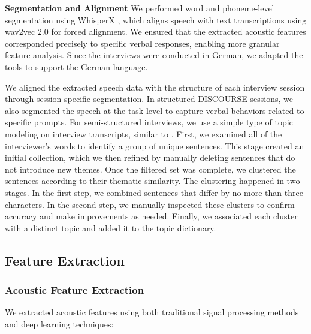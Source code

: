 \documentclass[9pt,a4paper]{rho-class/rho}
\begin{document}
\textbf{Segmentation and Alignment} We performed word and phoneme-level segmentation using WhisperX \cite{bain2023whisperx, Spiller2023}, which aligns speech with text transcriptions using wav2vec 2.0 \cite{baevski2020wav2vec} for forced alignment. We ensured that the extracted acoustic features corresponded precisely to specific verbal responses, enabling more granular feature analysis. Since the interviews were conducted in German, we adapted the tools to support the German language.

We aligned the extracted speech data with the structure of each interview session through session-specific segmentation. In structured DISCOURSE sessions, we also segmented the speech at the task level to capture verbal behaviors related to specific prompts. For semi-structured interviews, we use a simple type of topic modeling on interview transcripts, similar to \cite{gong2017topic}. First, we examined all of the interviewer's words to identify a group of unique sentences. This stage created an initial collection, which we then refined by manually deleting sentences that do not introduce new themes. Once the filtered set was complete, we clustered the sentences according to their thematic similarity. The clustering happened in two stages. In the first step, we combined sentences that differ by no more than three characters. In the second step, we manually inspected these clusters to confirm accuracy and make improvements as needed. Finally, we associated each cluster with a distinct topic and added it to the topic dictionary.

\subsection{Feature Extraction}

\subsubsection{Acoustic Feature Extraction}

We extracted acoustic features using both traditional signal processing methods and deep learning techniques:
\end{document}
